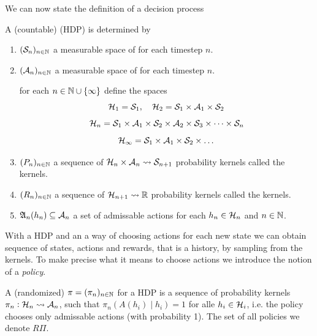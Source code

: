 We can now state the definition of a decision process

\begin{defn}
  A (countable)
   (HDP) is determined by
  \begin{enumerate}
    \item $(\mathcal{S}_n)_{n \in \mathbb{N}}$ a 
      measurable space of  for each timestep $n$.
    \item $(\mathcal{A}_n)_{n \in \mathbb{N}}$ a 
      measurable space of  for each timestep $n$.

      for each $n \in \mathbb{N} \cup \{\infty\}$
      define the  spaces
      \[ \mathcal{H}_1 = \mathcal{S}_1, \quad
      \mathcal{H}_2 = \mathcal{S}_1 \times \mathcal{A}_1\times \mathcal{S}_2 \]
      \[ \mathcal{H}_n = \mathcal{S}_1 \times \mathcal{A}_1
	\times \mathcal{S}_2 \times \mathcal{A}_2
      \times \mathcal{S}_3 \times \dots \times \mathcal{S}_n \]
      \[
	\mathcal{H}_\infty = \mathcal{S}_1 \times \mathcal{A}_1 \times \mathcal{S}_2 \times
	\dots
      \]
    \item $(P_n)_{n \in \mathbb{N}}$ a sequence of
      $\mathcal{H}_n \times \mathcal{A}_n \leadsto \mathcal{S}_{n+1}$ probability kernels
      called the  kernels.
    \item $(R_n)_{n \in \mathbb{N}}$ a sequence of
      $\mathcal{H}_{n+1} \leadsto \mathbb{R}$ probability kernels
      called the  kernels.
    \item $\frak{A}_n(h_n) \subseteq \mathcal{A}_n$ a set of admissable actions
      for each $h_n \in \mathcal{H}_n$ and $n \in \mathbb{N}$.
  \end{enumerate}
  \label{sett:HDP}
\end{defn}

With a HDP and an a way of choosing actions for each new state
we can obtain sequence of states, actions and rewards, that is
a history, by sampling from the kernels.
To make precise what it means to choose actions we introduce the notion
of a \emph{policy}.

\begin{defn}[Policy]
  A (randomized)  $\pi = (\pi_n)_{n \in \mathbb{N}}$ for a
  HDP is a sequence of probability kernels 
  $\pi_n : \mathcal{H}_n \leadsto \mathcal{A}_n$,
  such that $\pi_n(A(h_i) \mid h_i) = 1$ for alle $h_i \in \mathcal{H}_i$,
  i.e. the policy chooses only admissable actions (with probability 1).
  The set of all policies we denote $R\Pi$.
\end{defn}

